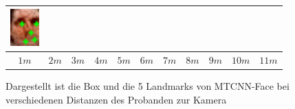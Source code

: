 \begin{figure}
\begin{tabular}{|c|c|c|c|c|c|c|c|c|c|c|}
		\includegraphics[width=1.1cm]{img_MTCNN/Img11-4_pupil1}\\
		\hline
		$1m$& $2m$& $3m$& $4m$& $5m$& $6m$& $7m$& $8m$& $9m$& $10m$& $11m$\\\hline
	\end{tabular}
	\caption{Dargestellt ist die Box und die 5 Landmarks von MTCNN-Face bei verschiedenen Distanzen des Probanden zur Kamera}
	\label{img_bereich_MTCNN}
\end{figure}
